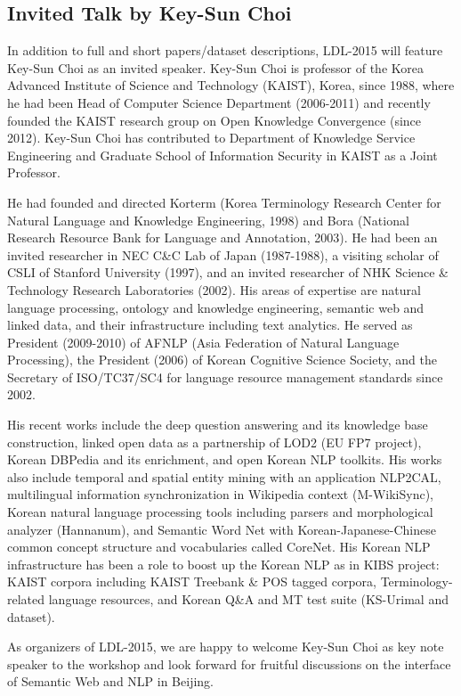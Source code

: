 \subsection{Invited Talk by Key-Sun Choi}

In addition to full and short papers/dataset descriptions, LDL-2015 will feature Key-Sun Choi as an invited speaker. Key-Sun Choi is professor of the Korea Advanced Institute of Science and Technology (KAIST), Korea, since 1988, where he had been Head of Computer Science Department (2006-2011) and recently founded the KAIST research group on Open Knowledge Convergence (since 2012). Key-Sun Choi has contributed to Department of Knowledge Service Engineering and Graduate School of Information Security in KAIST as a Joint Professor.

He had founded and directed Korterm (Korea Terminology Research Center for Natural Language and Knowledge Engineering, 1998) and Bora (National Research Resource Bank for Language and Annotation, 2003). He had been an invited researcher in NEC C\&C Lab of Japan (1987-1988), a visiting scholar of CSLI of Stanford University (1997), and an invited researcher of NHK Science \& Technology Research Laboratories (2002). His areas of expertise are natural language processing, ontology and knowledge engineering, semantic web and linked data, and their infrastructure including text analytics. He served as President (2009-2010) of AFNLP (Asia Federation of Natural Language Processing), the President (2006) of Korean Cognitive Science Society, and the Secretary of ISO/TC37/SC4 for language resource management standards since 2002. 

His recent works include the deep question answering and its knowledge base construction, linked open data as a partnership of LOD2 (EU FP7 project), Korean DBPedia and its enrichment, and open Korean NLP toolkits. His works also include temporal and spatial entity mining with an application NLP2CAL, multilingual information synchronization in Wikipedia context (M-WikiSync), Korean natural language processing tools including parsers and morphological analyzer (Hannanum), and Semantic Word Net with Korean-Japanese-Chinese common concept structure and vocabularies called CoreNet.  His Korean NLP infrastructure has been a role to boost up the Korean NLP as in KIBS project: KAIST corpora including KAIST Treebank \& POS tagged corpora, Terminology-related language resources, and Korean Q\&A and MT test suite (KS-Urimal and dataset). 

As organizers of LDL-2015, we are happy to welcome Key-Sun Choi as key note speaker to the workshop and look forward for fruitful discussions on the interface of Semantic Web and NLP in Beijing.

